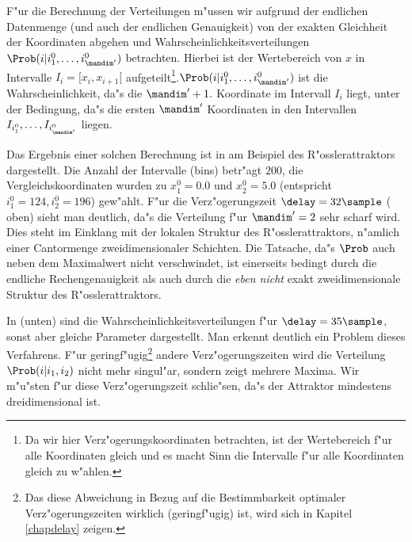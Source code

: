 F"ur die Berechnung der Verteilungen m"ussen wir aufgrund der endlichen Datenmenge (und
auch der endlichen Genauigkeit) von der exakten Gleichheit der Koordinaten abgehen und
Wahrscheinlichkeitsverteilungen $\Prob(i\vert i^0_1,\dots,i^0_{\mandim'})$ betrachten.
Hierbei ist der Wertebereich von $x$ in Intervalle $I_i=[x_i,x_{i+1}[$
aufgeteilt\footnote{Da wir hier Verz"ogerungskoordinaten betrachten, ist der Wertebereich
  f"ur alle Koordinaten gleich und es macht Sinn die Intervalle f"ur alle Koordinaten
  gleich zu w"ahlen.}.\@ $\Prob(i\vert i^0_1,\dots,i^0_{\mandim'})$ ist die
Wahrscheinlichkeit, da"s die $\mandim'+1.$ Koordinate im Intervall $I_i$ liegt, unter der
Bedingung, da"s die ersten $\mandim'$ Koordinaten in den Intervallen
$I_{i^0_1},\dots,I_{i^0_{\mandim'}}$ liegen.

Das Ergebnis einer solchen Berechnung ist in  am Beispiel des
R"osslerattraktors dargestellt. Die Anzahl der Intervalle (bins) betr"agt $200$, die
Vergleichskoordinaten wurden zu $x^0_1=0.0$ und $x^0_2=5.0$ (entspricht $i^0_1=124,
i^0_2=196$) gew"ahlt. F"ur die Verz"ogerungszeit $\delay=32\sample$ ( oben)
sieht man deutlich, da"s die Verteilung f"ur $\mandim'=2$ sehr scharf wird. Dies steht im
Einklang mit der lokalen Struktur des R"osslerattraktors, n"amlich einer Cantormenge
zweidimensionaler Schichten. Die Tatsache, da"s $\Prob$ auch neben dem Maximalwert nicht
verschwindet, ist einerseits bedingt durch die endliche Rechengenauigkeit als auch durch
die \emph{eben nicht} exakt zweidimensionale Struktur des R"osslerattraktors.

In  (unten) sind die Wahrscheinlichkeitsverteilungen f"ur
$\delay=35\sample$, sonst aber gleiche Parameter dargestellt. Man erkennt deutlich ein
Problem dieses Verfahrens. F"ur geringf"ugig\footnote{Das diese Abweichung in Bezug auf
  die Bestimmbarkeit optimaler Verz"ogerungszeiten wirklich \begriff(geringf"ugig) ist,
  wird sich in Kapitel \ref{chapdelay} zeigen.} andere Verz"ogerungszeiten wird die
Verteilung $\Prob(i\vert i_1,i_2)$ nicht mehr singul"ar, sondern zeigt mehrere Maxima. Wir
m"u"sten f"ur diese Verz"ogerungszeit schlie"sen, da"s der Attraktor mindestens
dreidimensional ist.


